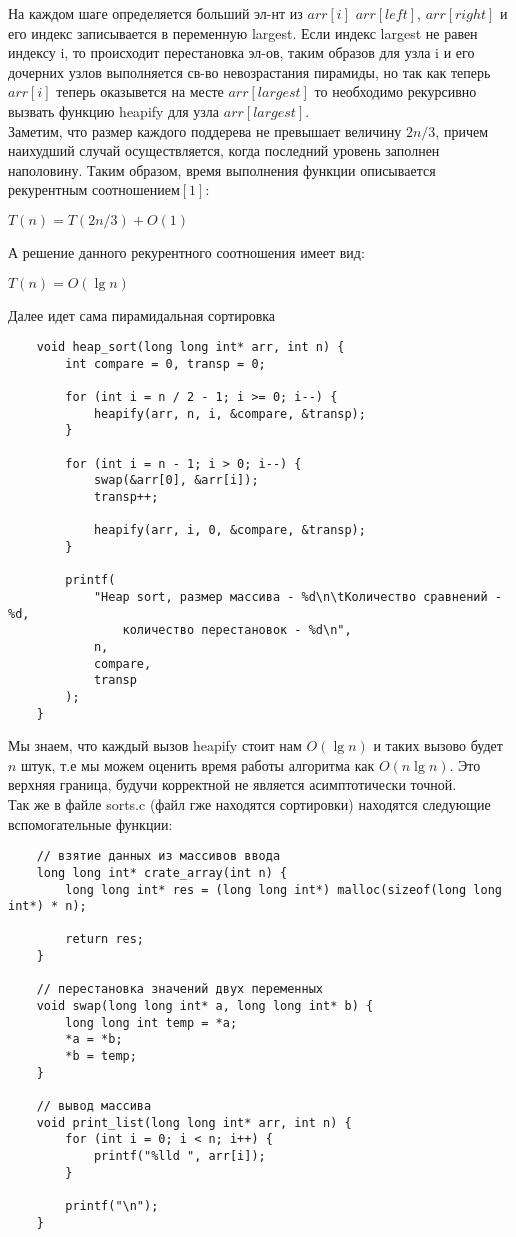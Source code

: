 \documentclass[a4paper,12pt,titlepage,finall]{article}
\begin{document}
На каждом шаге определяется больший эл-нт из $arr[i]$ $arr[left]$, $arr[right]$ и его
индекс записывается в переменную largest. Если индекс largest не равен
индексу i, то происходит перестановка эл-ов, таким образов для 
узла i и его дочерних узлов выполняется св-во невозрастания пирамиды, но так как 
теперь $arr[i]$ теперь оказывется на месте $arr[largest]$ то необходимо
рекурсивно вызвать функцию heapify для узла $arr[largest]$.
\\
Заметим, что размер каждого поддерева не превышает величину $2n/3$, причем наихудший
случай осуществляется, когда последний уровень заполнен наполовину. Таким образом,
время выполнения функции описывается рекурентным соотношением$[1]$: 
\begin{center}
    $T(n) = T(2n/3) + O(1)$
\end{center}

А решение данного рекурентного соотношения имеет вид:
\begin{center}
    $T(n) = O(\lg n)$
\end{center}

Далее идет сама пирамидальная сортировка

\begin{verbatim}
    void heap_sort(long long int* arr, int n) {
        int compare = 0, transp = 0;

        for (int i = n / 2 - 1; i >= 0; i--) {
            heapify(arr, n, i, &compare, &transp);
        }

        for (int i = n - 1; i > 0; i--) {
            swap(&arr[0], &arr[i]);
            transp++;

            heapify(arr, i, 0, &compare, &transp);
        }

        printf(
            "Heap sort, размер массива - %d\n\tКоличество сравнений - %d,
                количество перестановок - %d\n",
            n,
            compare,
            transp
        );
    }
\end{verbatim}

Мы знаем, что каждый вызов heapify стоит нам $O(\lg n)$ и таких вызово будет
$n$ штук, т.е мы можем оценить время работы алгоритма как $O(n\lg n)$. Это верхняя граница, будучи корректной
не является асимптотически точной.
\\

Так же в файле sorts.c (файл гже находятся сортировки) находятся следующие вспомогательные функции:

\begin{verbatim}
    // взятие данных из массивов ввода
    long long int* crate_array(int n) {
        long long int* res = (long long int*) malloc(sizeof(long long int*) * n);

        return res;
    }

    // перестановка значений двух переменных
    void swap(long long int* a, long long int* b) {
        long long int temp = *a;
        *a = *b;
        *b = temp;
    }

    // вывод массива
    void print_list(long long int* arr, int n) {
        for (int i = 0; i < n; i++) {
            printf("%lld ", arr[i]);
        }

        printf("\n");
    }
\end{verbatim}
\end{document}
